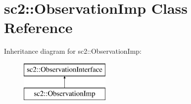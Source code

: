\hypertarget{classsc2_1_1_observation_imp}{}\section{sc2\+:\+:Observation\+Imp Class Reference}
\label{classsc2_1_1_observation_imp}
Inheritance diagram for sc2\+:\+:Observation\+Imp\+:\begin{figure}[H]
\begin{center}
\leavevmode
\includegraphics[height=2.000000cm]{classsc2_1_1_observation_imp}
\end{center}
\end{figure}
